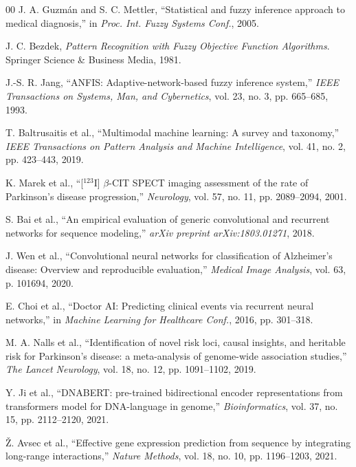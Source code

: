 \documentclass[conference]{IEEEtran}
\begin{document}
\begin{thebibliography}{00}
J. A. Guzmán and S. C. Mettler, ``Statistical and fuzzy inference approach to medical diagnosis,'' in \textit{Proc. Int. Fuzzy Systems Conf.}, 2005.

J. C. Bezdek, \textit{Pattern Recognition with Fuzzy Objective Function Algorithms}. Springer Science \& Business Media, 1981.

J.-S. R. Jang, ``ANFIS: Adaptive-network-based fuzzy inference system,'' \textit{IEEE Transactions on Systems, Man, and Cybernetics}, vol. 23, no. 3, pp. 665--685, 1993.

T. Baltrusaitis et al., ``Multimodal machine learning: A survey and taxonomy,'' \textit{IEEE Transactions on Pattern Analysis and Machine Intelligence}, vol. 41, no. 2, pp. 423--443, 2019.

K. Marek et al., ``[$^{123}$I] $\beta$-CIT SPECT imaging assessment of the rate of Parkinson's disease progression,'' \textit{Neurology}, vol. 57, no. 11, pp. 2089--2094, 2001.

S. Bai et al., ``An empirical evaluation of generic convolutional and recurrent networks for sequence modeling,'' \textit{arXiv preprint arXiv:1803.01271}, 2018.

J. Wen et al., ``Convolutional neural networks for classification of Alzheimer's disease: Overview and reproducible evaluation,'' \textit{Medical Image Analysis}, vol. 63, p. 101694, 2020.

E. Choi et al., ``Doctor AI: Predicting clinical events via recurrent neural networks,'' in \textit{Machine Learning for Healthcare Conf.}, 2016, pp. 301--318.

M. A. Nalls et al., ``Identification of novel risk loci, causal insights, and heritable risk for Parkinson's disease: a meta-analysis of genome-wide association studies,'' \textit{The Lancet Neurology}, vol. 18, no. 12, pp. 1091--1102, 2019.

Y. Ji et al., ``DNABERT: pre-trained bidirectional encoder representations from transformers model for DNA-language in genome,'' \textit{Bioinformatics}, vol. 37, no. 15, pp. 2112--2120, 2021.

Ž. Avsec et al., ``Effective gene expression prediction from sequence by integrating long-range interactions,'' \textit{Nature Methods}, vol. 18, no. 10, pp. 1196--1203, 2021.


\end{thebibliography}
\end{document}
